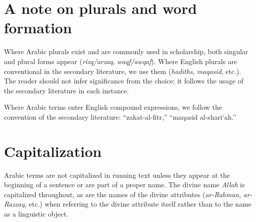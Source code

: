 \section*{A note on plurals and word formation}

Where Arabic plurals exist and are commonly used in scholarship, both
singular and plural forms appear (\textit{rizq/arzaq},
\textit{waqf/awqaf}). Where English plurals are conventional in the
secondary literature, we use them (\textit{hadiths},
\textit{maqasid}, etc.). The reader should not infer significance
from the choice; it follows the usage of the secondary literature in
each instance.

Where Arabic terms enter English compound expressions, we follow the
convention of the secondary literature: ``zakat-al-fitr,''
``maqasid al-shari`ah.''

\section*{Capitalization}

Arabic terms are not capitalized in running text unless they appear at
the beginning of a sentence or are part of a proper name. The divine
name \textit{Allah} is capitalized throughout, as are the names of the
divine attributes (\textit{ar-Rahman}, \textit{ar-Razzaq}, etc.) when
referring to the divine attribute itself rather than to the name as a
linguistic object.

\cleardoublepage
